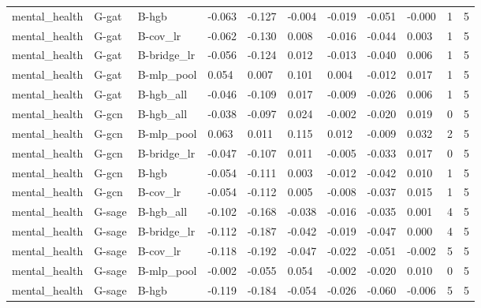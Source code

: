 \begin{table}[t]
\begin{tabular}{lllllllllll}
mental\_health & G-gat & B-hgb & -0.063 & -0.127 & -0.004 & -0.019 & -0.051 & -0.000 & 1 & 5 \\
mental\_health & G-gat & B-cov\_lr & -0.062 & -0.130 & 0.008 & -0.016 & -0.044 & 0.003 & 1 & 5 \\
mental\_health & G-gat & B-bridge\_lr & -0.056 & -0.124 & 0.012 & -0.013 & -0.040 & 0.006 & 1 & 5 \\
mental\_health & G-gat & B-mlp\_pool & 0.054 & 0.007 & 0.101 & 0.004 & -0.012 & 0.017 & 1 & 5 \\
mental\_health & G-gat & B-hgb\_all & -0.046 & -0.109 & 0.017 & -0.009 & -0.026 & 0.006 & 1 & 5 \\
mental\_health & G-gcn & B-hgb\_all & -0.038 & -0.097 & 0.024 & -0.002 & -0.020 & 0.019 & 0 & 5 \\
mental\_health & G-gcn & B-mlp\_pool & 0.063 & 0.011 & 0.115 & 0.012 & -0.009 & 0.032 & 2 & 5 \\
mental\_health & G-gcn & B-bridge\_lr & -0.047 & -0.107 & 0.011 & -0.005 & -0.033 & 0.017 & 0 & 5 \\
mental\_health & G-gcn & B-hgb & -0.054 & -0.111 & 0.003 & -0.012 & -0.042 & 0.010 & 1 & 5 \\
mental\_health & G-gcn & B-cov\_lr & -0.054 & -0.112 & 0.005 & -0.008 & -0.037 & 0.015 & 1 & 5 \\
mental\_health & G-sage & B-hgb\_all & -0.102 & -0.168 & -0.038 & -0.016 & -0.035 & 0.001 & 4 & 5 \\
mental\_health & G-sage & B-bridge\_lr & -0.112 & -0.187 & -0.042 & -0.019 & -0.047 & 0.000 & 4 & 5 \\
mental\_health & G-sage & B-cov\_lr & -0.118 & -0.192 & -0.047 & -0.022 & -0.051 & -0.002 & 5 & 5 \\
mental\_health & G-sage & B-mlp\_pool & -0.002 & -0.055 & 0.054 & -0.002 & -0.020 & 0.010 & 0 & 5 \\
mental\_health & G-sage & B-hgb & -0.119 & -0.184 & -0.054 & -0.026 & -0.060 & -0.006 & 5 & 5 \\
\bottomrule
\end{tabular}
\end{table}
